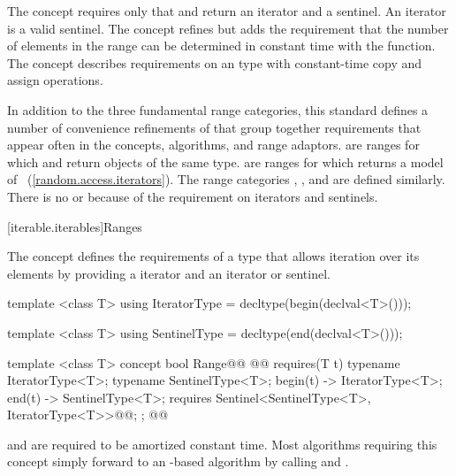 \begin{addedblock}
\pnum
The  concept requires only that  and 
return an iterator and a sentinel. \enternote An iterator is a valid sentinel.
\exitnote The  concept refines  but adds
the requirement that the number of elements in the range can be determined
in constant time with the  function. The  concept describes
requirements on an  type with constant-time copy and assign
operations.

\pnum
In addition to the three fundamental range categories, this standard defines
a number of convenience refinements of  that group together requirements
that appear often in the concepts, algorithms, and range adaptors.
 are ranges for which  and  return objects of the
same type.  are ranges for which
 returns a model of
~(\ref{random.access.iterators}). The range
categories ,
,
 and
 are defined similarly.
\enternote There is no  or
 because of the 
requirement on iterators and sentinels. \exitnote {}

[iterable.iterables]{Ranges}

\pnum
The  concept defines the requirements of a type that allows
iteration over its elements by providing a  iterator and an
 iterator or sentinel.

\begin{codeblock}
template <class T>
using IteratorType = decltype(begin(declval<T>()));

template <class T>
using SentinelType = decltype(end(declval<T>()));

template <class T>
concept bool Range@\newtxt{() \{}\oldtxt{ =}@
  @@ requires(T t) {
    typename IteratorType<T>;
    typename SentinelType<T>;
    { begin(t) } -> IteratorType<T>;
    { end(t) } -> SentinelType<T>;
    requires Sentinel<SentinelType<T>, IteratorType<T>>@\newtxt{()}@;
  };
@\newtxt{\}}@
\end{codeblock}

 and  are required to be amortized constant time.
\enternote Most algorithms requiring this concept simply forward to an
-based algorithm by calling  and . \exitnote


\end{addedblock}
